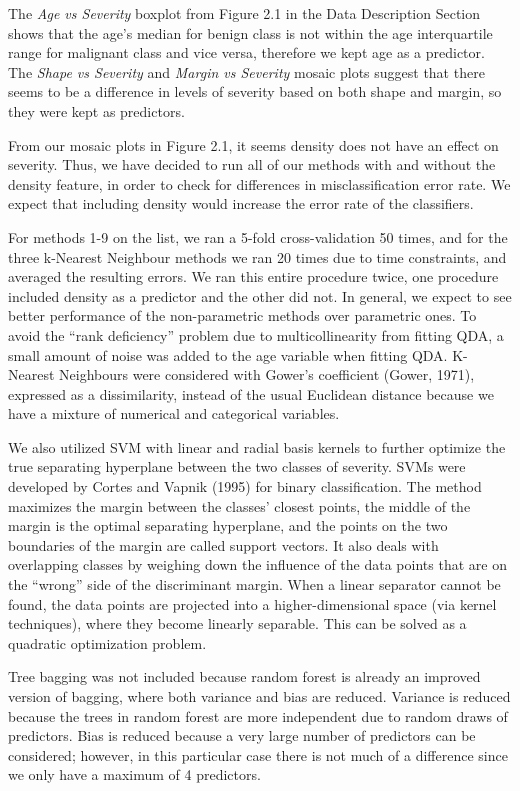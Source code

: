 \documentclass[11pt]{article}
\begin{document}
	The \textit{Age vs Severity} boxplot from Figure 2.1 in the Data Description Section shows that the age's median for benign class is not within the age interquartile range for malignant class and vice versa, therefore we kept age as a predictor. The \textit{Shape vs Severity} and \textit{Margin vs Severity} mosaic plots suggest that there seems to be a difference in levels of severity based on both shape and margin, so they were kept as predictors.
	
	From our mosaic plots in Figure 2.1, it seems density does not have an effect on severity. Thus, we have decided to run all of our methods with and without the density feature, in order to check for differences in misclassification error rate. We expect that including density would increase the error rate of the classifiers.
	
	For methods 1-9 on the list, we ran a 5-fold cross-validation 50 times, and for the three k-Nearest Neighbour methods we ran 20 times due to time constraints, and averaged the resulting errors. We ran this entire procedure twice, one procedure included density as a predictor and the other did not. In general, we expect to see better performance of the non-parametric methods over parametric ones. To avoid the ``rank deficiency'' problem due to multicollinearity from fitting QDA, a small amount of noise was added to the age variable when fitting QDA. K-Nearest Neighbours were considered with Gower's coefficient (Gower, 1971), expressed as a dissimilarity, instead of the usual Euclidean distance because we have a mixture of numerical and categorical variables.
	
	We also utilized SVM with linear and radial basis kernels to further optimize the true separating hyperplane between the two classes of severity. SVMs were developed by Cortes and Vapnik (1995) for binary classification. The method maximizes the margin between the classes' closest points, the middle of the margin is the optimal separating hyperplane, and the points on the two boundaries of the margin are called support vectors. It also deals with overlapping classes by weighing down the influence of the data points that are on the ``wrong'' side of the discriminant margin. When a linear separator cannot be found, the data points are projected into a higher-dimensional space (via kernel techniques), where they become linearly separable. This can be solved as a quadratic optimization problem.
	
	Tree bagging was not included because random forest is already an improved version of bagging, where both variance and bias are reduced. Variance is reduced because the trees in random forest are more independent due to random draws of predictors. Bias is reduced because a very large number of predictors can be considered; however, in this particular case there is not much of a difference since we only have a maximum of 4 predictors.
	
\end{document}
